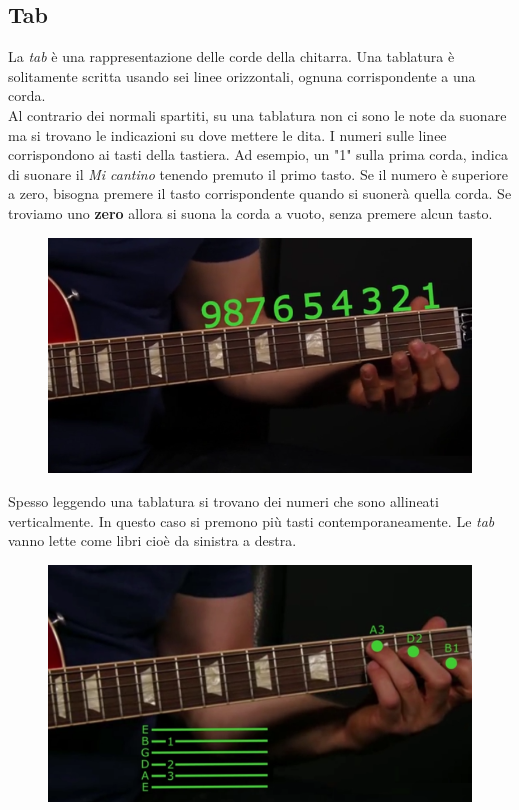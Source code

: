 \subsection{Tab}
La \textit{tab} è una rappresentazione delle corde della chitarra. Una tablatura è solitamente scritta usando sei linee orizzontali, ognuna corrispondente a una corda.\\
Al contrario dei normali spartiti, su una tablatura non ci sono le note da suonare ma si trovano le indicazioni su dove mettere le dita. I numeri sulle linee corrispondono ai tasti della tastiera. Ad esempio, un "1" sulla prima corda, indica di suonare il \textit{Mi cantino} tenendo premuto il primo tasto.
Se il numero è superiore a zero, bisogna premere il tasto corrispondente quando si suonerà quella corda. Se troviamo uno \textbf{zero} allora si suona la corda a vuoto, senza premere alcun tasto.
\begin{figure}[H]
	\centering
	\includegraphics[scale=0.50]{./images/img15.png}
\end{figure}

Spesso leggendo una tablatura si trovano dei numeri che sono allineati verticalmente. In questo caso si premono più tasti contemporaneamente. Le \textit{tab} vanno lette come libri cioè da sinistra a destra.
\begin{figure}[H]
	\centering
	\includegraphics[scale=0.50]{./images/img16.png}
\end{figure}